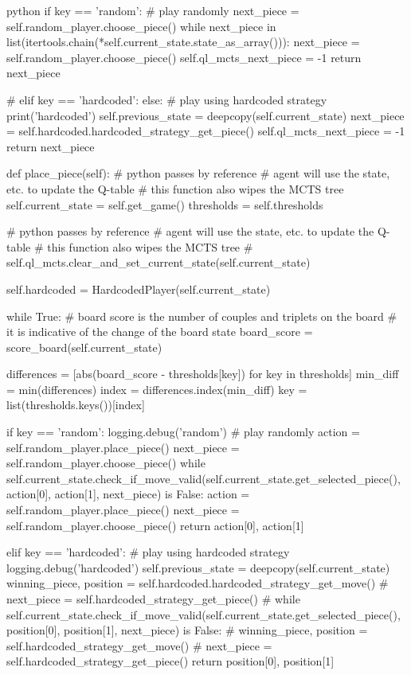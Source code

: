 \begin{mintedbox}{python}
        if key == 'random':
            # play randomly
            next_piece = self.random_player.choose_piece()
            while next_piece in list(itertools.chain(*self.current_state.state_as_array())):
                next_piece = self.random_player.choose_piece()
            self.ql_mcts_next_piece = -1
            return next_piece

        # elif key == 'hardcoded':
        else:
            # play using hardcoded strategy
            print('hardcoded')
            self.previous_state = deepcopy(self.current_state)
            next_piece = self.hardcoded.hardcoded_strategy_get_piece()
            self.ql_mcts_next_piece = -1
            return next_piece

    def place_piece(self):
        # python passes by reference
        # agent will use the state, etc. to update the Q-table
        # this function also wipes the MCTS tree
        self.current_state = self.get_game()
        thresholds = self.thresholds

        # python passes by reference
        # agent will use the state, etc. to update the Q-table
        # this function also wipes the MCTS tree
        # self.ql_mcts.clear_and_set_current_state(self.current_state)

        self.hardcoded = HardcodedPlayer(self.current_state)

        while True:
            # board score is the number of couples and triplets on the board
            # it is indicative of the change of the board state
            board_score = score_board(self.current_state)

            differences = [abs(board_score - thresholds[key])
                            for key in thresholds]
            min_diff = min(differences)
            index = differences.index(min_diff)
            key = list(thresholds.keys())[index]

            if key == 'random':
                logging.debug('random')
                # play randomly
                action = self.random_player.place_piece()
                next_piece = self.random_player.choose_piece()
                while self.current_state.check_if_move_valid(self.current_state.get_selected_piece(), action[0], action[1], next_piece) is False:
                    action = self.random_player.place_piece()
                    next_piece = self.random_player.choose_piece()
                return action[0], action[1]

            elif key == 'hardcoded':
                # play using hardcoded strategy
                logging.debug('hardcoded')
                self.previous_state = deepcopy(self.current_state)
                winning_piece, position = self.hardcoded.hardcoded_strategy_get_move()
                # next_piece = self.hardcoded_strategy_get_piece()
                # while self.current_state.check_if_move_valid(self.current_state.get_selected_piece(), position[0], position[1], next_piece) is False:
                #     winning_piece, position = self.hardcoded_strategy_get_move()
                #     next_piece = self.hardcoded_strategy_get_piece()
                return position[0], position[1]


\end{mintedbox}
